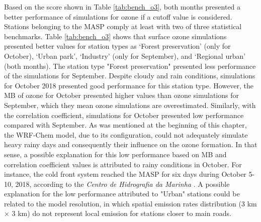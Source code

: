  Based on the score shown in Table \ref{tab:bench_o3}, both months presented a better performance of simulations for ozone if a cutoff value is considered. 
Stations belonging to the MASP comply at least with two of three statistical benchmarks.
Table \ref{tab:bench_o3} shows that surface ozone simulations presented better values for station types as `Forest preservation' (only for October), `Urban park', `Industry' (only for September), and `Regional urban' (both months).
The station type "Forest preservation" presented less performance of the simulations for September.
 Despite cloudy and rain conditions, simulations for October 2018 presented good performance for this station type.
 However, the MB of ozone for October presented higher values than ozone simulations for September, which they mean ozone simulations are overestimated.
 Similarly, with the correlation coefficient, simulations for October presented low performance compared with September.
 As was mentioned at the beginning of this chapter, the WRF-Chem model, due to its configuration, could not adequately simulate heavy rainy days and consequently their influence on the ozone formation.
  In that sense, a possible explanation for this low performance based on MB and correlation coefficient values is attributed to rainy conditions in October. For instance, the cold front system reached the MASP for six days during October 5-10, 2018, according to the \textit{Centro de Hidrografia da Marinha} \citep{CHM2020}.
  A possible explanation for the low performance attributed to "Urban" stations could be related to the model resolution, in which spatial emission rates distribution (3 km $\times$ 3 km) do not represent local emission for stations closer to main roads.
  

